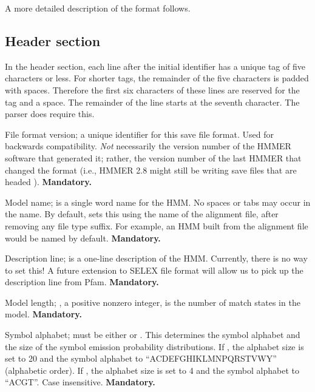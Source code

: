 A more detailed description of the format follows.

\subsection{Header section}

In the header section, each line after the initial identifier has a
unique tag of five characters or less. For shorter tags, the remainder
of the five characters is padded with spaces. Therefore the first six
characters of these lines are reserved for the tag and a space. The
remainder of the line starts at the seventh character. The parser does
require this.

\begin{wideitem}

\item [\emprog{HMMER2.0}]
File format version; a unique identifier for this save file format. Used for backwards
compatibility. {\em Not} necessarily the version number of the HMMER
software that generated it; rather, the version number of the last
HMMER that changed the format (i.e., HMMER 2.8 might still be writing
save files that are headed ).
\textbf{Mandatory.}

\item [\emprog{NAME  <s>}] Model name;  is a single word name for the HMM.
No spaces or tabs may occur in the name. By default, 
sets this using the name of the alignment file, after removing any
file type suffix. For example, an HMM built from the alignment file
 would be named  by default.
\textbf{Mandatory.}

\item [\emprog{DESC  <s>}] Description line;  is a one-line description 
of the HMM. Currently, there is no way to set this! A future extension
to SELEX file format will allow us to pick up the description line
from Pfam.
\textbf{Mandatory.}

\item [\emprog{LENG  <d>}] Model length; , a positive nonzero integer, 
is the number of match states in the model.
\textbf{Mandatory.}

\item [\emprog{ALPH  <s>}] Symbol alphabet;  must be either
 or . This determines the symbol alphabet and the
size of the symbol emission probability distributions.  If
, the alphabet size is set to 20 and the symbol alphabet
to ``ACDEFGHIKLMNPQRSTVWY'' (alphabetic order). If , the
alphabet size is set to 4 and the symbol alphabet to ``ACGT''.  Case
insensitive. \textbf{Mandatory.}


\end{wideitem}
